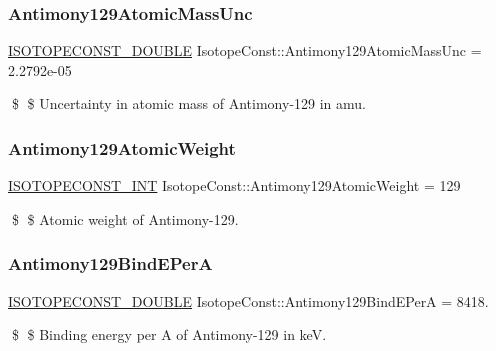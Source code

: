 \subsubsection{\texorpdfstring{Antimony129\+Atomic\+Mass\+Unc}{Antimony129AtomicMassUnc}}
{\footnotesize\ttfamily \mbox{\hyperlink{group___isotope_const-_macros_ga8f45a7272ce02c0b4c65c44636ed719a}{I\+S\+O\+T\+O\+P\+E\+C\+O\+N\+S\+T\+\_\+\+D\+O\+U\+B\+LE}} Isotope\+Const\+::\+Antimony129\+Atomic\+Mass\+Unc = 2.\+2792e-\/05}

\$ \$ Uncertainty in atomic mass of Antimony-\/129 in amu. \mbox{\label{group___isotope_const-_antimony-_sb129_gab5ce21efdc08267778f12d6d78ee4118}} 
\subsubsection{\texorpdfstring{Antimony129\+Atomic\+Weight}{Antimony129AtomicWeight}}
{\footnotesize\ttfamily \mbox{\hyperlink{group___isotope_const-_macros_ga5f18360b3e99483a35c32d789e62621c}{I\+S\+O\+T\+O\+P\+E\+C\+O\+N\+S\+T\+\_\+\+I\+NT}} Isotope\+Const\+::\+Antimony129\+Atomic\+Weight = 129}

\$ \$ Atomic weight of Antimony-\/129. \mbox{\label{group___isotope_const-_antimony-_sb129_gaacfbf9a3c08d9b2780ee714cb144382c}} 
\subsubsection{\texorpdfstring{Antimony129\+Bind\+E\+PerA}{Antimony129BindEPerA}}
{\footnotesize\ttfamily \mbox{\hyperlink{group___isotope_const-_macros_ga8f45a7272ce02c0b4c65c44636ed719a}{I\+S\+O\+T\+O\+P\+E\+C\+O\+N\+S\+T\+\_\+\+D\+O\+U\+B\+LE}} Isotope\+Const\+::\+Antimony129\+Bind\+E\+PerA = 8418.}

\$ \$ Binding energy per A of Antimony-\/129 in keV. \mbox{\label{group___isotope_const-_antimony-_sb129_gac0642f66e2d93c1e368a476696715cf5}} 
